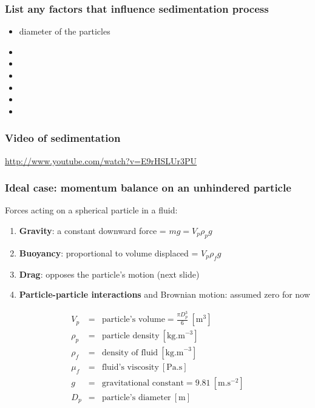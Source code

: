 \begin{frame}\frametitle{List any factors that influence sedimentation process}
	\begin{itemize}
		\item	diameter of the particles
		\pause
		\item	\iftoggle{instructor}{relative density of particle vs fluid}{}
		\item	\iftoggle{instructor}{viscosity of fluid}{}
		\item	\iftoggle{instructor}{particle concentration (hindered)}{}
		\item	\iftoggle{instructor}{diameter of the vessel: NO}{}
		\item	\iftoggle{instructor}{mass of particle: NO}{}
		\item	\iftoggle{instructor}{diameter of the vessel: NO}{}
	\end{itemize}
\end{frame}



\begin{frame}\frametitle{Video of sedimentation}
	\href{http://www.youtube.com/watch?v=E9rHSLUr3PU}{http://www.youtube.com/watch?v=E9rHSLUr3PU}
\end{frame}

\begin{frame}\frametitle{Ideal case: momentum balance on an unhindered particle}	
	Forces acting on a spherical particle in a fluid:
	\begin{enumerate}
		\item	\textbf{Gravity}: a constant downward force = $mg = V_p \rho_p g$		
		\item	\textbf{Buoyancy}: proportional to volume displaced = $V_p \rho_f g$
		\item	\textbf{Drag}: opposes the particle's motion (next slide)
		\item	\textbf{Particle-particle interactions} and Brownian motion: assumed zero for now
	\end{enumerate}	
	\[
		\begin{array}{rcl}
			V_p		&=& \text{particle's volume} = \displaystyle \frac{\pi D_p^3}{6} ~[\text{m}^3]\\
			\rho_p 	&=& \text{particle density}~[\text{kg.m}^{-3}]\\
			\rho_f  &=& \text{density of fluid}~[\text{kg.m}^{-3}]\\
			\mu_f   &=& \text{fluid's viscosity}~[\text{Pa.s}]\\
			g		&=& \text{gravitational constant} = 9.81~[\text{m.s}^{-2}] \\
			D_p 	&=& \text{particle's diameter}~[\text{m}]
		\end{array}
	\]
\end{frame}

